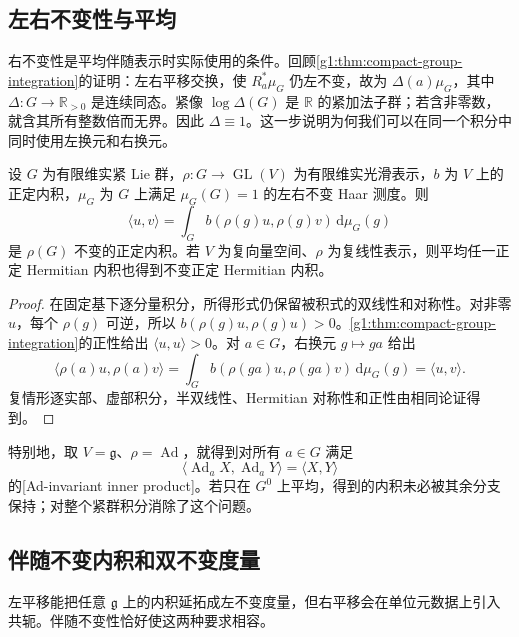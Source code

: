 \subsection{左右不变性与平均}
\label{g1:subsec:1901:02}
右不变性是平均伴随表示时实际使用的条件。回顾\cref{g1:thm:compact-group-integration}的证明：左右平移交换，使 \(R_a^*\mu_G\) 仍左不变，故为 \(\Delta(a)\mu_G\)，其中 \(\Delta:G\to\mathbb R_{>0}\) 是连续同态。紧像 \(\log\Delta(G)\) 是 \(\mathbb R\) 的紧加法子群；若含非零数，就含其所有整数倍而无界。因此 \(\Delta\equiv1\)。这一步说明为何我们可以在同一个积分中同时使用左换元和右换元。

\begin{proposition}\label{g1:prop:compact-representation-inner-product}
	设 \(G\) 为有限维实紧 Lie 群，\(\rho:G\to\operatorname{GL}(V)\) 为有限维实光滑表示，\(b\) 为 \(V\) 上的正定内积，\(\mu_G\) 为 \(G\) 上满足 \(\mu_G(G)=1\) 的左右不变 Haar 测度。则
	\[
		\langle u,v\rangle
		=\int_G b(\rho(g)u,\rho(g)v)\,\mathrm{d}\mu_G(g)
	\]
	是 \(\rho(G)\) 不变的正定内积。若 \(V\) 为复向量空间、\(\rho\) 为复线性表示，则平均任一正定 Hermitian 内积也得到不变正定 Hermitian 内积。
\end{proposition}
\begin{proof}
	在固定基下逐分量积分，所得形式仍保留被积式的双线性和对称性。对非零 \(u\)，每个 \(\rho(g)\) 可逆，所以 \(b(\rho(g)u,\rho(g)u)>0\)。\cref{g1:thm:compact-group-integration}的正性给出 \(\langle u,u\rangle>0\)。对 \(a\in G\)，右换元 \(g\mapsto ga\) 给出
	\[
		\langle\rho(a)u,\rho(a)v\rangle
		=\int_G b(\rho(ga)u,\rho(ga)v)\,\mathrm{d}\mu_G(g)
		=\langle u,v\rangle.
	\]
	复情形逐实部、虚部积分，半双线性、Hermitian 对称性和正性由相同论证得到。
\end{proof}

特别地，取 \(V=\mathfrak g\)、\(\rho=\operatorname{Ad}\)，就得到对所有 \(a\in G\) 满足
\[
	\langle\operatorname{Ad}_aX,\operatorname{Ad}_aY\rangle
	=\langle X,Y\rangle
\]
的[Ad-invariant inner product]。若只在 \(G^0\) 上平均，得到的内积未必被其余分支保持；对整个紧群积分消除了这个问题。

\subsection{伴随不变内积和双不变度量}
\label{g1:subsec:1901:03}
左平移能把任意 \(\mathfrak g\) 上的内积延拓成左不变度量，但右平移会在单位元数据上引入共轭。伴随不变性恰好使这两种要求相容。

